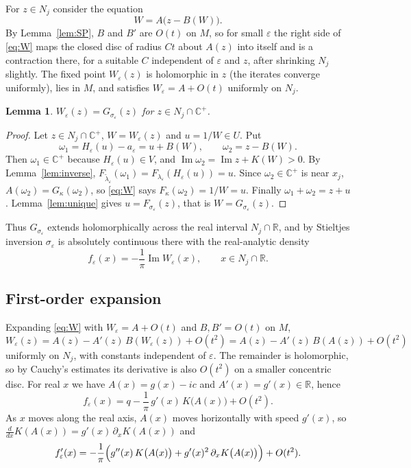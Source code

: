 \documentclass[11pt]{amsart}
\newtheorem{lemma}[theorem]{Lemma}
\theoremstyle{definition}
\theoremstyle{remark}
\numberwithin{equation}{section}
\newcommand{\R}{\mathbb{R}}
\newcommand{\Hp}{\mathbb{C}^+}
\newcommand{\eps}{\varepsilon}
\begin{document}
For $z\in N_j$ consider the equation
\begin{equation}\label{eq:W}
W=A\bigl(z-B(W)\bigr).
\end{equation}
By Lemma~\ref{lem:SP}, $B$ and $B'$ are $O(t)$ on $M$, so for small $\eps$ the right side of \eqref{eq:W} maps the closed disc of radius $C t$ about $A(z)$ into itself and is a contraction there, for a suitable $C$ independent of $\eps$ and $z$, after shrinking $N_j$ slightly. The fixed point $W_\eps(z)$ is holomorphic in $z$ (the iterates converge uniformly), lies in $M$, and satisfies $W_\eps=A+O(t)$ uniformly on $N_j$.

\begin{lemma}\label{lem:ident}
$W_\eps(z)=G_{\sigma_\eps}(z)$ for $z\in N_j\cap\Hp$.
\end{lemma}

\begin{proof}
Let $z\in N_j\cap\Hp$, $W=W_\eps(z)$ and $u=1/W\in U$. Put
\[
\omega_1=H_\eps(u)-a_\eps=u+B(W),\qquad \omega_2=z-B(W).
\]
Then $\omega_1\in\Hp$ because $H_\eps(u)\in V$, and $\operatorname{Im}\omega_2=\operatorname{Im}z+K(W)>0$. By Lemma~\ref{lem:inverse}, $F_{\tilde\lambda_\eps}(\omega_1)=F_{\lambda_\eps}(H_\eps(u))=u$. Since $\omega_2\in\Hp$ is near $x_j$, $A(\omega_2)=G_\kappa(\omega_2)$, so \eqref{eq:W} says $F_\kappa(\omega_2)=1/W=u$. Finally $\omega_1+\omega_2=z+u$. Lemma~\ref{lem:unique} gives $u=F_{\sigma_\eps}(z)$, that is $W=G_{\sigma_\eps}(z)$.
\end{proof}

Thus $G_{\sigma_\eps}$ extends holomorphically across the real interval $N_j\cap\R$, and by Stieltjes inversion $\sigma_\eps$ is absolutely continuous there with the real-analytic density
\[
f_\eps(x)=-\frac1\pi\operatorname{Im}W_\eps(x),\qquad x\in N_j\cap\R .
\]

\subsection{First-order expansion}
Expanding \eqref{eq:W} with $W_\eps=A+O(t)$ and $B,B'=O(t)$ on $M$,
\[
W_\eps(z)=A(z)-A'(z)\,B(W_\eps(z))+O(t^2)=A(z)-A'(z)\,B(A(z))+O(t^2)
\]
uniformly on $N_j$, with constants independent of $\eps$. The remainder is holomorphic, so by Cauchy's estimates its derivative is also $O(t^2)$ on a smaller concentric disc. For real $x$ we have $A(x)=g(x)-ic$ and $A'(x)=g'(x)\in\R$, hence
\[
f_\eps(x)=q-\frac1\pi\,g'(x)\,K\bigl(A(x)\bigr)+O(t^2).
\]
As $x$ moves along the real axis, $A(x)$ moves horizontally with speed $g'(x)$, so $\frac{d}{dx}K(A(x))=g'(x)\,\partial_xK(A(x))$ and
\begin{equation}\label{eq:fprime}
f_\eps'(x)=-\frac1\pi\Bigl(g''(x)\,K\bigl(A(x)\bigr)+g'(x)^2\,\partial_xK\bigl(A(x)\bigr)\Bigr)+O(t^2).
\end{equation}
\end{document}
